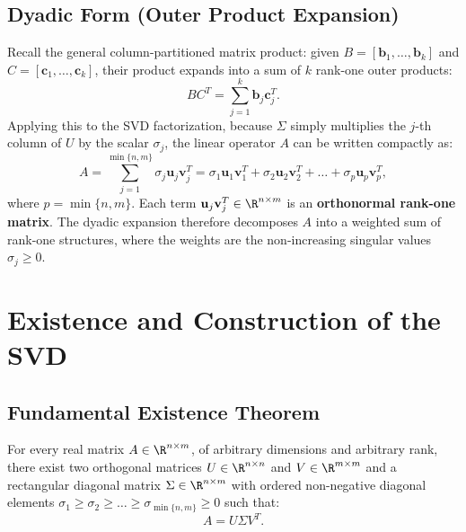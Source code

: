 \subsection{Dyadic Form (Outer Product Expansion)}

Recall the general column-partitioned matrix product: given $B = [\mathbf{b}_1, \dots, \mathbf{b}_k]$ and $C = [\mathbf{c}_1, \dots, \mathbf{c}_k]$, their product expands into a sum of $k$ rank-one outer products:
\begin{equation}
    B C^T = \sum_{j=1}^k \mathbf{b}_j \mathbf{c}_j^T.
\end{equation}
Applying this to the SVD factorization, because $\Sigma$ simply multiplies the $j$-th column of $U$ by the scalar $\sigma_j$, the linear operator $A$ can be written compactly as:
\begin{equation}
\label{eq:svd-dyadic-form-en}
    A = \sum_{j=1}^{\min\{n, m\}} \sigma_j \mathbf{u}_j \mathbf{v}_j^T = \sigma_1 \mathbf{u}_1 \mathbf{v}_1^T + \sigma_2 \mathbf{u}_2 \mathbf{v}_2^T + \dots + \sigma_p \mathbf{u}_p \mathbf{v}_p^T,
\end{equation}
where $p = \min\{n, m\}$. Each term $\mathbf{u}_j \mathbf{v}_j^T \in \R^{n \times m}$ is an \textbf{orthonormal rank-one matrix}. The dyadic expansion therefore decomposes $A$ into a weighted sum of rank-one structures, where the weights are the non-increasing singular values $\sigma_j \ge 0$.

\FloatBarrier
\section{Existence and Construction of the SVD}
\label{sec:svd-existence-construction-en}

\subsection{Fundamental Existence Theorem}

\begin{theorem}
\label{thm:existence-svd-en}
For every real matrix $A \in \R^{n \times m}$, of arbitrary dimensions and arbitrary rank, there exist two orthogonal matrices $U \in \R^{n \times n}$ and $V \in \R^{m \times m}$ and a rectangular diagonal matrix $\Sigma \in \R^{n \times m}$ with ordered non-negative diagonal elements $\sigma_1 \ge \sigma_2 \ge \dots \ge \sigma_{\min\{n,m\}} \ge 0$ such that:
\begin{equation}
    A = U \Sigma V^T.
\end{equation}
\end{theorem}


